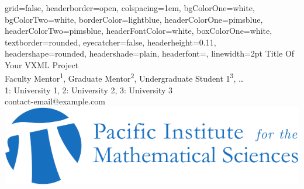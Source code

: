 \documentclass[a0paper,portrait]{baposter}
\begin{document}

\begin{poster}
{
grid=false,
headerborder=open, %
colspacing=1em, %
bgColorOne=white, %
bgColorTwo=white, %
borderColor=lightblue, %
headerColorOne=pimsblue, %
headerColorTwo=pimsblue, %
headerFontColor=white, %
boxColorOne=white, %
textborder=rounded, %
eyecatcher=false, %
headerheight=0.11\textheight, %
headershape=rounded, %
headershade=plain,
headerfont=\Large\textsf, %
linewidth=2pt %
}
{}
%
%
{
\textsf %
{Title Of Your VXML Project}
} %
{\sf\vspace{0.5em}\\
Faculty Mentor\textsuperscript{1},
Graduate Mentor\textsuperscript{2},
Undergraduate Student 1\textsuperscript{3}, \ldots
\vspace{0.1em}\\
\small{1: University 1, 2: University 2, 3: University 3
\vspace{0.2em}\\
contact-email@example.com}
}
{\includegraphics[width=0.3\linewidth]{logo}} %



\end{poster}
\end{document}

